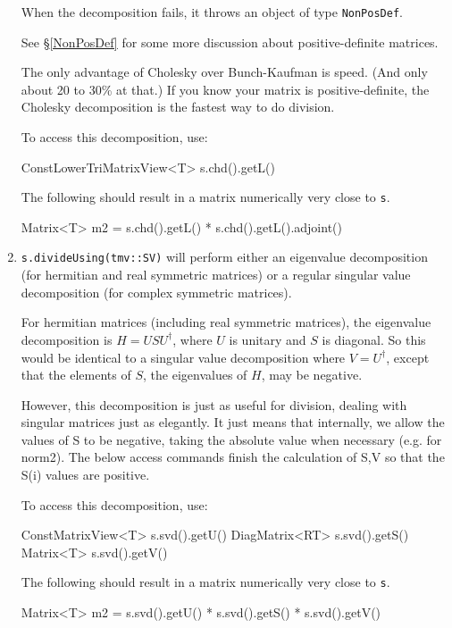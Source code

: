 \documentclass[twoside,letterpaper,11pt]{article}
\renewcommand{\tt}[1]{{\lstinline {#1}}}
\begin{document}
\begin{enumerate}
When the decomposition fails, it throws an object of type
\tt{NonPosDef}.

See \S\ref{NonPosDef} for some more discussion about positive-definite
matrices.

The only advantage of Cholesky over Bunch-Kaufman is speed.  (And only about
20 to 30\% at that.)  If you know your 
matrix is positive-definite, the Cholesky decomposition is the fastest way to 
do division.

To access this decomposition, use:
\begin{tmvcode}
ConstLowerTriMatrixView<T> s.chd().getL()
\end{tmvcode}
The following should result in a matrix numerically very close to \tt{s}.
\begin{tmvcode}
Matrix<T> m2 = s.chd().getL() * s.chd().getL().adjoint()
\end{tmvcode}

\item
\tt{s.divideUsing(tmv::SV)} will perform either an eigenvalue decomposition
(for hermitian and real symmetric matrices) or a regular singular value
decomposition (for complex symmetric matrices).

For hermitian matrices (including real symmetric matrices), 
the eigenvalue decomposition is $H = U S U^\dagger$, where $U$ is
unitary and $S$ is diagonal.  So this would be identical to a singular
value decomposition where $V = U^\dagger$, 
except that the elements of $S$, the eigenvalues of $H$, may be negative.

However, this decomposition is just as useful for division, dealing with singular
matrices just as elegantly.  It just means that internally, we allow the values
of S to be negative, taking the absolute value when necessary (e.g. for norm2).
The below access commands finish the calculation of S,V so that the S(i)
values are positive. 

To access this decomposition, use:
\begin{tmvcode}
ConstMatrixView<T> s.svd().getU()
DiagMatrix<RT> s.svd().getS()
Matrix<T> s.svd().getV()
\end{tmvcode}
The following should result in a matrix numerically very close to \tt{s}.
\begin{tmvcode}
Matrix<T> m2 = s.svd().getU() * s.svd().getS() * s.svd().getV()
\end{tmvcode}


\end{enumerate}
\end{document}
